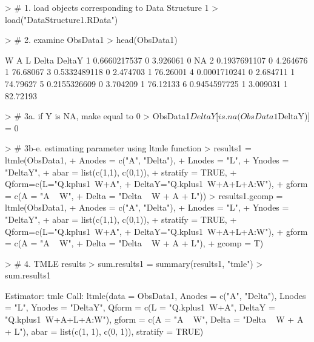 \documentclass{exam}
\begin{document}
\begin{solution}
\begin{Schunk}
\begin{Sinput}
> # 1. load objects corresponding to Data Structure 1
> load("DataStructure1.RData")
\end{Sinput}
\end{Schunk}
\begin{Schunk}
\begin{Sinput}
> # 2. examine ObsData1
> head(ObsData1)
\end{Sinput}
\begin{Soutput}
             W A        L Delta   DeltaY
1 0.6660217537 0 3.926061     0       NA
2 0.1937691107 0 4.264676     1 76.68067
3 0.5332489118 0 2.474703     1 76.26001
4 0.0001710241 0 2.684711     1 74.79627
5 0.2155326609 0 3.704209     1 76.12133
6 0.9454597725 1 3.009031     1 82.72193
\end{Soutput}
\end{Schunk}
\begin{Schunk}
\begin{Sinput}
> # 3a. if Y is NA, make equal to 0
> ObsData1$DeltaY[is.na(ObsData1$DeltaY)] = 0
\end{Sinput}
\end{Schunk}
\begin{Schunk}
\begin{Sinput}
> # 3b-e. estimating parameter using ltmle function
> results1 = ltmle(ObsData1, 
+                  Anodes = c("A", "Delta"), 
+                  Lnodes = "L", 
+                  Ynodes = "DeltaY", 
+                  abar = list(c(1,1), c(0,1)), 
+                  stratify = TRUE,
+                  Qform=c(L="Q.kplus1~W+A", 
+                          DeltaY="Q.kplus1~W+A+L+A:W"),
+                  gform = c(A = "A ~ W",
+                            Delta = "Delta ~ W + A + L"))
> results1.gcomp = ltmle(ObsData1, 
+                        Anodes = c("A", "Delta"), 
+                        Lnodes = "L",
+                        Ynodes = "DeltaY", 
+                        abar = list(c(1,1), c(0,1)), 
+                        stratify = TRUE,
+                        Qform=c(L="Q.kplus1~W+A", 
+                                DeltaY="Q.kplus1~W+A+L+A:W"),
+                        gform = c(A = "A ~ W",
+                                  Delta = "Delta ~ W + A + L"),
+                        gcomp = T)
\end{Sinput}
\end{Schunk}
\begin{Schunk}
\begin{Sinput}
> # 4. TMLE results
> sum.results1 = summary(results1, "tmle")
> sum.results1
\end{Sinput}
\begin{Soutput}
Estimator:  tmle 
Call:
ltmle(data = ObsData1, Anodes = c("A", "Delta"), Lnodes = "L", 
    Ynodes = "DeltaY", Qform = c(L = "Q.kplus1~W+A", DeltaY = "Q.kplus1~W+A+L+A:W"), 
    gform = c(A = "A ~ W", Delta = "Delta ~ W + A + L"), abar = list(c(1, 
        1), c(0, 1)), stratify = TRUE)


\end{Soutput}
\end{Schunk}
\end{solution}
\end{document}
